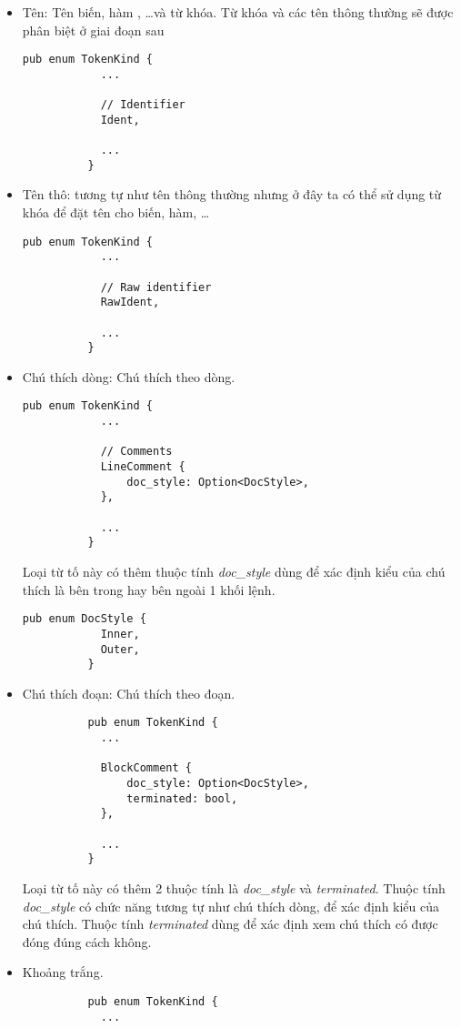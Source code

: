 \begin{itemize}
\begin{itemize}
    \end{itemize}
  \item Tên: Tên biến, hàm , \dots\space và từ khóa. Từ khóa và các tên thông thường sẽ được phân biệt ở giai đoạn sau
        \begin{lstlisting}[]
          pub enum TokenKind {
            ...
        
            // Identifier
            Ident,
        
            ...
          }
        \end{lstlisting}
  \item Tên thô: tương tự như tên thông thường nhưng ở đây ta có thể sử dụng từ khóa để đặt tên cho biến, hàm, \dots
        \begin{lstlisting}[]
          pub enum TokenKind {
            ...
        
            // Raw identifier
            RawIdent,
        
            ...
          }
        \end{lstlisting}
  \item Chú thích dòng: Chú thích theo dòng. 
        \begin{lstlisting}[]
          pub enum TokenKind {
            ...
        
            // Comments
            LineComment {
                doc_style: Option<DocStyle>,
            },

            ...
          }
        \end{lstlisting}
        Loại từ tố này có thêm thuộc tính \textit{doc\_style} dùng để xác định kiểu của chú thích là bên trong hay bên ngoài 1 khối lệnh.
        \begin{lstlisting}[]
          pub enum DocStyle {
            Inner,
            Outer,
          }
        \end{lstlisting}
  \item Chú thích đoạn:  Chú thích theo đoạn. 
        \begin{lstlisting}
          pub enum TokenKind {
            ...

            BlockComment {
                doc_style: Option<DocStyle>,
                terminated: bool,
            },

            ...
          }
        \end{lstlisting}
        Loại từ tố này có thêm 2 thuộc tính là \textit{doc\_style} và \textit{terminated}. Thuộc tính \textit{doc\_style} có chức năng tương tự như chú thích dòng, để xác định kiểu của chú thích. Thuộc tính \textit{terminated} dùng để xác định xem chú thích có được đóng đúng cách không.
  \item Khoảng trắng.
        \begin{lstlisting}
          pub enum TokenKind {
            ...


\end{lstlisting}
\end{itemize}
